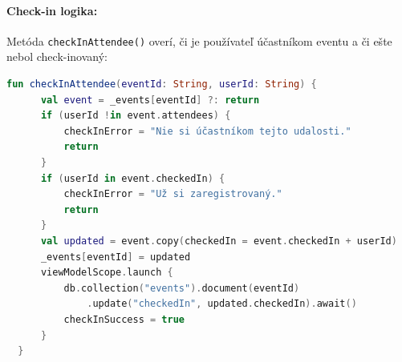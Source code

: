   \paragraph{Check-in logika:}
  Metóda \texttt{checkInAttendee()} overí, či je používateľ účastníkom eventu
  a či ešte nebol check-inovaný:

  \begin{lstlisting}[language=Kotlin, caption=Logika check-inu v AppViewModel]
  fun checkInAttendee(eventId: String, userId: String) {
      val event = _events[eventId] ?: return
      if (userId !in event.attendees) {
          checkInError = "Nie si účastníkom tejto udalosti."
          return
      }
      if (userId in event.checkedIn) {
          checkInError = "Už si zaregistrovaný."
          return
      }
      val updated = event.copy(checkedIn = event.checkedIn + userId)
      _events[eventId] = updated
      viewModelScope.launch {
          db.collection("events").document(eventId)
              .update("checkedIn", updated.checkedIn).await()
          checkInSuccess = true
      }
  }
  \end{lstlisting}


